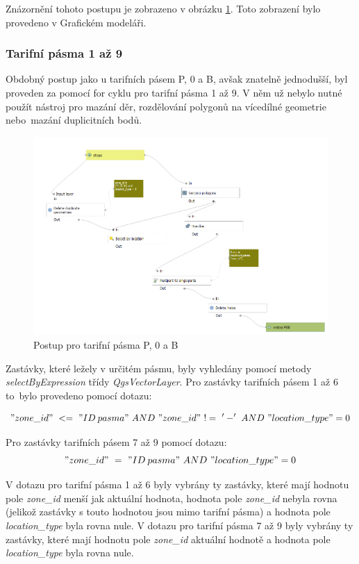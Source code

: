 Znázornění tohoto postupu je zobrazeno v obrázku \ref{fig:postup-voronoi-P0B}. Toto zobrazení bylo provedeno v Grafickém modeláři.

\subsubsection{Tarifní pásma 1 až 9}
\label{tp_1az9}

Obdobný postup jako u tarifních pásem P, 0 a B, avšak znatelně jednodušší, byl proveden za pomocí
for cyklu pro tarifní pásma 1 až 9. V něm už nebylo nutné použít nástroj pro mazání děr, rozdělování polygonů
na vícedílné geometrie nebo~mazání duplicitních bodů. 

\begin{figure}[H] \centering
    \includegraphics[width=400pt]{./pictures/postup-voronoi-P0B.png}
    \caption[Postup pro tarifní pásma P, 0 a B]{Postup pro tarifní pásma P, 0 a B}
	\label{fig:postup-voronoi-P0B}              
\end{figure}

Zastávky, které ležely v určitém pásmu, byly vyhledány pomocí metody \textit{selectByExpression} třídy 
\textit{QgsVectorLayer}. Pro zastávky tarifních pásem 1 až 6 to~bylo provedeno pomocí dotazu:

\["zone\_id"\ <=\ "ID\: pasma"\ AND\ "zone\_id"\ !=\ '-'\ AND\ "location\_type" = 0\]  

Pro zastávky tarifních pásem 7 až 9 pomocí dotazu:
\["zone\_id"\ =\ "ID\: pasma"\ AND\ "location\_type" = 0\] 

V dotazu pro tarifní pásma 1 až 6 byly vybrány ty zastávky, které mají hodnotu pole \textit{zone\_id} menší jak aktuální hodnota,
hodnota pole \textit{zone\_id} nebyla rovna  (jelikož zastávky s touto hodnotou jsou mimo tarifní pásma)
a hodnota pole \textit{location\_type} byla rovna nule. V dotazu pro tarifní pásma 7 až 9 byly vybrány ty zastávky,
které mají hodnotu pole \textit{zone\_id} aktuální hodnotě a hodnota pole \textit{location\_type} byla rovna nule.

